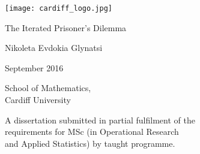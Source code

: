 \begin{titlepage}
	\begin{center}
		\vspace*{1cm}
		\texttt{[image: cardiff\_logo.jpg]}

		\vspace{60pt}

		\Huge
		The Iterated Prisoner's Dilemma

		\vspace{2cm}

		\Large
		Nikoleta Evdokia Glynatsi

		\vspace{2cm}
		\large
		September 2016

		\vspace{2cm}

		School of Mathematics,\\Cardiff University

		\vfill

		\normalsize
		A dissertation submitted in partial fulfilment of the\\ requirements for MSc (in
		Operational Research\\ and Applied Statistics) by taught programme.

	\end{center}
\end{titlepage}
